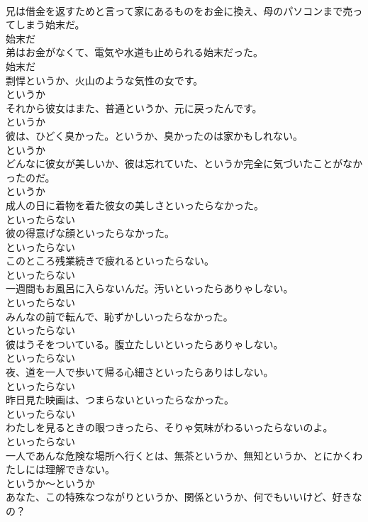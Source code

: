 \documentclass[8pt]{extreport}
\begin{document}
\begin{CJK}{UTF8}{min}
\\	兄は借金を返すためと言って家にあるものをお金に換え、母のパソコンまで売ってしまう始末だ。	
\\	始末だ	
\\	弟はお金がなくて、電気や水道も止められる始末だった。	
\\	始末だ	
\\	剽悍というか、火山のような気性の女です。	
\\	というか	
\\	それから彼女はまた、普通というか、元に戻ったんです。	
\\	というか	
\\	彼は、ひどく臭かった。というか、臭かったのは家かもしれない。	
\\	というか	
\\	どんなに彼女が美しいか、彼は忘れていた、というか完全に気づいたことがなかったのだ。	
\\	というか	
\\	成人の日に着物を着た彼女の美しさといったらなかった。	
\\	といったらない	
\\	彼の得意げな顔といったらなかった。	
\\	といったらない	
\\	このところ残業続きで疲れるといったらない。	
\\	といったらない	
\\	一週間もお風呂に入らないんだ。汚いといったらありゃしない。	
\\	といったらない	
\\	みんなの前で転んで、恥ずかしいったらなかった。	
\\	といったらない	
\\	彼はうそをついている。腹立たしいといったらありゃしない。	
\\	といったらない	
\\	夜、道を一人で歩いて帰る心細さといったらありはしない。	
\\	といったらない	
\\	昨日見た映画は、つまらないといったらなかった。	
\\	といったらない	
\\	わたしを見るときの眼つきったら、そりゃ気味がわるいったらないのよ。	
\\	といったらない	
\\	一人であんな危険な場所へ行くとは、無茶というか、無知というか、とにかくわたしには理解できない。	
\\	というか～というか	
\\	あなた、この特殊なつながりというか、関係というか、何でもいいけど、好きなの？	

\end{CJK}
\end{document}
